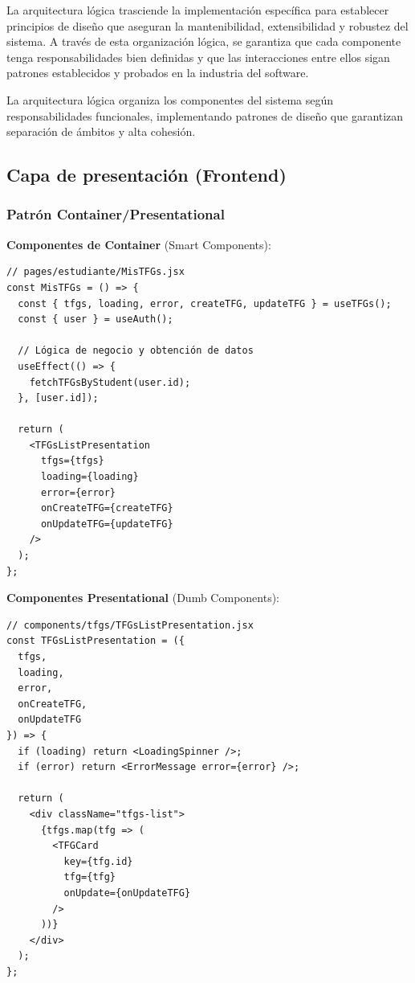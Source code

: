 \documentclass[12pt,a4paper,oneside]{report}
\begin{document}
La arquitectura lógica trasciende la implementación específica para
establecer principios de diseño que aseguran la mantenibilidad,
extensibilidad y robustez del sistema. A través de esta organización
lógica, se garantiza que cada componente tenga responsabilidades bien
definidas y que las interacciones entre ellos sigan patrones
establecidos y probados en la industria del software.

La arquitectura lógica organiza los componentes del sistema según
responsabilidades funcionales, implementando patrones de diseño que
garantizan separación de ámbitos y alta cohesión.

\subsection{Capa de presentación
(Frontend)}\label{capa-de-presentaciuxf3n-frontend}

\subsubsection{Patrón
Container/Presentational}\label{patruxf3n-containerpresentational}

\textbf{Componentes de Container} (Smart Components):

\begin{lstlisting}
// pages/estudiante/MisTFGs.jsx
const MisTFGs = () => {
  const { tfgs, loading, error, createTFG, updateTFG } = useTFGs();
  const { user } = useAuth();
  
  // Lógica de negocio y obtención de datos
  useEffect(() => {
    fetchTFGsByStudent(user.id);
  }, [user.id]);
  
  return (
    <TFGsListPresentation 
      tfgs={tfgs}
      loading={loading}
      error={error}
      onCreateTFG={createTFG}
      onUpdateTFG={updateTFG}
    />
  );
};
\end{lstlisting}

\textbf{Componentes Presentational} (Dumb Components):

\begin{lstlisting}
// components/tfgs/TFGsListPresentation.jsx
const TFGsListPresentation = ({ 
  tfgs, 
  loading, 
  error, 
  onCreateTFG, 
  onUpdateTFG 
}) => {
  if (loading) return <LoadingSpinner />;
  if (error) return <ErrorMessage error={error} />;
  
  return (
    <div className="tfgs-list">
      {tfgs.map(tfg => (
        <TFGCard 
          key={tfg.id} 
          tfg={tfg} 
          onUpdate={onUpdateTFG} 
        />
      ))}
    </div>
  );
};
\end{lstlisting}
\end{document}
